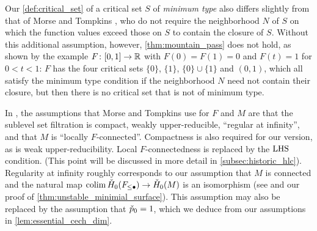\begin{rem}\label{rem:critical_set}
	Our \cref{def:critical_set} of a critical set $S$ of \emph{minimum type} also differs slightly from that of Morse and Tompkins \cite[p.~466]{Morse.1939}, who do not require the neighborhood $N$ of $S$ on which the function values exceed those on $S$ to contain the closure of $S$.
	Without this additional assumption, however, \cref{thm:mountain_pass} does not hold, as shown by the example $F \colon [0,1] \to \mathbb{R}$ with $F(0) = F(1) = 0$ and $F(t) = 1$ for $0 < t < 1$:
	$F$ has the four critical sets $\{0\}$, $\{1\}$, $\{0\} \cup \{1\}$ and $(0,1)$, which all satisfy the minimum type condition if the neighborhood $N$ need not contain their closure, but then there is no critical set that is not of minimum type.
\end{rem}

\begin{rem}\label{rem:mountain_pass_assumptions}
	In \cite[Corollary 7.1]{Morse.1939}, the assumptions that Morse and Tompkins use for $F$ and $M$ are that the sublevel set filtration is compact,  weakly upper-reducible, ``regular at infinity'', and that $M$ is ``locally $F$-connected''.
	Compactness is also required for our version, as is weak upper-reducibility.
	Local $F$-connectedness is replaced by the $\mathrm{LHS}$ condition.
	(This point will be discussed in more detail in \cref{subsec:historic_hlc}).
	Regularity at infinity roughly corresponds to our assumption that $M$ is connected and the natural map $\operatorname*{colim} \check{H}_0(F_{\leq \bullet}) \to \check{H}_0(M)$ is an isomorphism (see \cite[p.~444]{Morse.1939} and our proof of \cref{thm:unstable_minimial_surface}).
	This assumption may also be replaced by the assumption that $\check{p}_0 = 1$, which we deduce from our assumptions in \cref{lem:essential_cech_dim}.
\end{rem}

